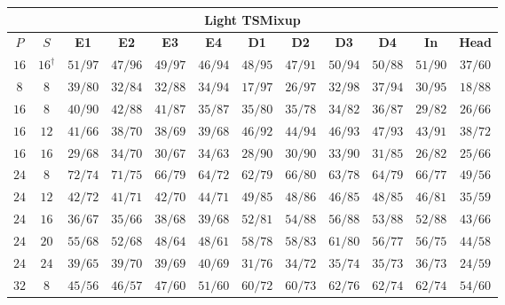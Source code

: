 \begin{table}[!tbp]
    \centering
    \color{red}\captionsetup{font+=probingred} %
    \small
    \setlength{\tabcolsep}{3.5pt}
    \begin{tabular}{@{}cccccccccccc@{}}
        \toprule
        \multicolumn{12}{c}{\textbf{Light TSMixup}} \\
        \midrule
        \textbf{$P$} & \textbf{$S$} & \textbf{E1} & \textbf{E2} & \textbf{E3} & \textbf{E4} & \textbf{D1} & \textbf{D2} & \textbf{D3} & \textbf{D4} & \textbf{In} & \textbf{Head} \\
        \midrule
        $16$ & $16^{\dagger}$ & $51/97$ & $47/96$ & $49/97$ & $46/94$ & $48/95$ & $47/91$ & $50/94$ & $50/88$ & $51/90$ & $37/60$ \\
        \midrule
        \addlinespace[2pt]
        $8$ & $8$ & $39/80$ & $32/84$ & $32/88$ & $34/94$ & $17/97$ & $26/97$ & $32/98$ & $37/94$ & $30/95$ & $18/88$ \\
        \addlinespace[2pt]
        $16$ & $8$ & $40/90$ & $42/88$ & $41/87$ & $35/87$ & $35/80$ & $35/78$ & $34/82$ & $36/87$ & $29/82$ & $26/66$ \\
        $16$ & $12$ & $41/66$ & $38/70$ & $38/69$ & $39/68$ & $46/92$ & $44/94$ & $46/93$ & $47/93$ & $43/91$ & $38/72$ \\
        $16$ & $16$ & $29/68$ & $34/70$ & $30/67$ & $34/63$ & $28/90$ & $30/90$ & $33/90$ & $31/85$ & $26/82$ & $25/66$ \\
        \addlinespace[2pt]
        $24$ & $8$ & $72/74$ & $71/75$ & $66/79$ & $64/72$ & $62/79$ & $66/80$ & $63/78$ & $64/79$ & $66/77$ & $49/56$ \\
        $24$ & $12$ & $42/72$ & $41/71$ & $42/70$ & $44/71$ & $49/85$ & $48/86$ & $46/85$ & $48/85$ & $46/81$ & $35/59$ \\
        $24$ & $16$ & $36/67$ & $35/66$ & $38/68$ & $39/68$ & $52/81$ & $54/88$ & $56/88$ & $53/88$ & $52/88$ & $43/66$ \\
        $24$ & $20$ & $55/68$ & $52/68$ & $48/64$ & $48/61$ & $58/78$ & $58/83$ & $61/80$ & $56/77$ & $56/75$ & $44/58$ \\
        $24$ & $24$ & $39/65$ & $39/70$ & $39/69$ & $40/69$ & $31/76$ & $34/72$ & $35/74$ & $35/73$ & $36/73$ & $24/59$ \\
        \addlinespace[2pt]
        $32$ & $8$ & $45/56$ & $46/57$ & $47/60$ & $51/60$ & $60/72$ & $60/73$ & $62/76$ & $62/74$ & $62/74$ & $54/60$ \\

\end{tabular}
\end{table}
